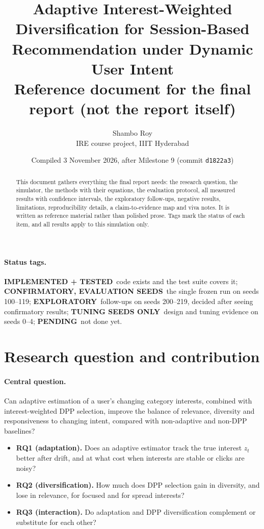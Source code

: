 \documentclass[11pt,a4paper]{article}
\title{Adaptive Interest-Weighted Diversification for Session-Based Recommendation under Dynamic User Intent\\[4pt]
\large Reference document for the final report (not the report itself)}
\author{Shambo Roy \\ IRE course project, IIIT Hyderabad}
\date{Compiled 3 November 2026, after Milestone 9 (commit \texttt{d1822a3})}
\newcommand{\statustag}[2]{\colorbox{#1}{\scriptsize\sffamily\bfseries #2}}
\newcommand{\implemented}{\statustag{blue!12}{IMPLEMENTED + TESTED}}
\newcommand{\confirmatory}{\statustag{green!18}{CONFIRMATORY, EVALUATION SEEDS}}
\newcommand{\exploratory}{\statustag{orange!20}{EXPLORATORY}}
\newcommand{\tuning}{\statustag{gray!20}{TUNING SEEDS ONLY}}
\newcommand{\pending}{\statustag{red!15}{PENDING}}
\begin{document}
\maketitle

\begin{abstract}
\noindent This document gathers everything the final report needs: the research question,
the simulator, the methods with their equations, the evaluation protocol, all measured
results with confidence intervals, the exploratory follow-ups, negative results,
limitations, reproducibility details, a claim-to-evidence map and viva notes. It is written
as reference material rather than polished prose. Tags mark the status of each item, and all
results apply to this simulation only.
\end{abstract}

\paragraph{Status tags.}
\implemented\ code exists and the test suite covers it;
\confirmatory\ the single frozen run on seeds 100--119;
\exploratory\ follow-ups on seeds 200--219, decided after seeing confirmatory results;
\tuning\ design and tuning evidence on seeds 0--4;
\pending\ not done yet.

\tableofcontents
\newpage

\section{Research question and contribution}

\paragraph{Central question.} Can adaptive estimation of a user's changing category
interests, combined with interest-weighted DPP selection, improve the balance of relevance,
diversity and responsiveness to changing intent, compared with non-adaptive and non-DPP
baselines?

\begin{itemize}
  \item \textbf{RQ1 (adaptation).} Does an adaptive estimator track the true interest $z_t$
        better after drift, and at what cost when interests are stable or clicks are noisy?
  \item \textbf{RQ2 (diversification).} How much does DPP selection gain in diversity, and lose in
        relevance, for focused and for spread interests?
  \item \textbf{RQ3 (interaction).} Do adaptation and DPP diversification complement or
        substitute for each other?
\end{itemize}
\end{document}
